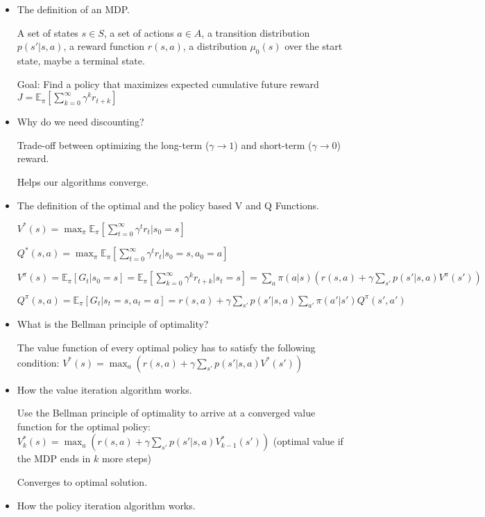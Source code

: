 \documentclass[11pt]{scrartcl}
\begin{document}
\begin{itemize}
    \item The definition of an MDP.
    
    A set of states $s \in S$, a set of actions $a \in A$, a transition distribution 
    $p(s' | s, a)$, a reward function $r(s, a)$, a distribution $\mu_0(s)$ over the start
    state, maybe a terminal state.

    Goal: Find a policy that maximizes expected cumulative future reward 
    $J = \mathbb{E}_\pi [\sum_{k=0}^\infty \gamma^k r_{t+k}]$

    \item Why do we need discounting?
    
    Trade-off between optimizing the long-term ($\gamma \rightarrow 1$) and short-term 
    ($\gamma \rightarrow 0$) reward.

    Helps our algorithms converge.

    \item The definition of the optimal and the policy based V and Q Functions.
    
    $V^*(s) = \max_\pi \mathbb{E}_\pi[\sum_{t=0}^\infty \gamma^t r_t|s_0 = s]$

    $Q^*(s,a) = \max_\pi \mathbb{E}_\pi[\sum_{t=0}^\infty \gamma^t r_t|s_0 = s,a_0 = a]$

    $V^\pi(s) = \mathbb{E}_\pi[G_t | s_0 = s] = \mathbb{E}_\pi[\sum_{k=0}^\infty \gamma^k r_{t+k} | s_t = s]
    = \sum_a \pi(a|s)(r(s,a) + \gamma\sum_{s'}p(s'|s,a)V^\pi(s'))$

    $Q^\pi(s,a) = \mathbb{E}_\pi[G_t|s_t = s,a_t = a] = r(s,a) + \gamma\sum_{s'}p(s'|s,a)\sum_{a'}\pi(a'|s')Q^\pi(s',a')$

    \item What is the Bellman principle of optimality?
    
    The value function of every optimal policy has to satisfy the following condition:
    $V^*(s) = \max_a (r(s,a) + \gamma\sum_{s'}p(s'|s,a)V^*(s'))$

    \item How the value iteration algorithm works.
    
    Use the Bellman principle of optimality to arrive at a converged value function for the
    optimal policy: $V_k^*(s) = \max_a (r(s,a) + \gamma\sum_{s'}p(s'|s,a)V_{k-1}^*(s'))$
    (optimal value if the MDP ends in $k$ more steps)

    Converges to optimal solution.

    \item How the policy iteration algorithm works.
    

\end{itemize}
\end{document}

